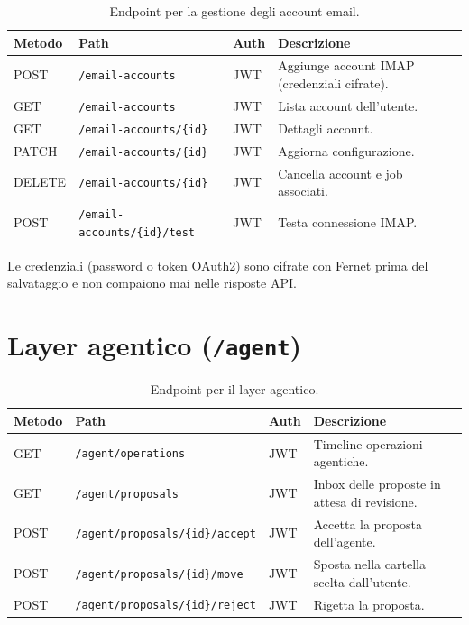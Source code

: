 \begin{table}[ht]
\centering
\small
\begin{tabularx}{\linewidth}{l l l X}
\toprule
\textbf{Metodo} & \textbf{Path} & \textbf{Auth} & \textbf{Descrizione} \\
\midrule
POST   & \texttt{/email-accounts}              & JWT & Aggiunge account IMAP (credenziali cifrate). \\
GET    & \texttt{/email-accounts}              & JWT & Lista account dell'utente. \\
GET    & \texttt{/email-accounts/\{id\}}       & JWT & Dettagli account. \\
PATCH  & \texttt{/email-accounts/\{id\}}       & JWT & Aggiorna configurazione. \\
DELETE & \texttt{/email-accounts/\{id\}}       & JWT & Cancella account e job associati. \\
POST   & \texttt{/email-accounts/\{id\}/test}  & JWT & Testa connessione IMAP. \\
\bottomrule
\end{tabularx}
\caption{Endpoint per la gestione degli account email.}
\end{table}

Le credenziali (password o token OAuth2) sono cifrate con Fernet prima del salvataggio
e non compaiono mai nelle risposte API.

\section{Layer agentico (\texttt{/agent})}
\label{sec:api_agent}

\begin{table}[ht]
\centering
\small
\begin{tabularx}{\linewidth}{l l l X}
\toprule
\textbf{Metodo} & \textbf{Path} & \textbf{Auth} & \textbf{Descrizione} \\
\midrule
GET  & \texttt{/agent/operations}                    & JWT & Timeline operazioni agentiche. \\
GET  & \texttt{/agent/proposals}                     & JWT & Inbox delle proposte in attesa di revisione. \\
POST & \texttt{/agent/proposals/\{id\}/accept}       & JWT & Accetta la proposta dell'agente. \\
POST & \texttt{/agent/proposals/\{id\}/move}         & JWT & Sposta nella cartella scelta dall'utente. \\
POST & \texttt{/agent/proposals/\{id\}/reject}       & JWT & Rigetta la proposta. \\
\bottomrule
\end{tabularx}
\caption{Endpoint per il layer agentico.}
\end{table}

